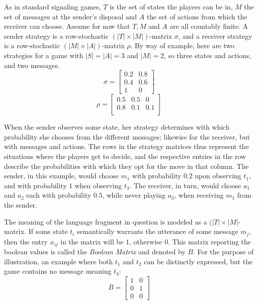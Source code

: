 \documentclass[10]{article}
\begin{document}
As in standard signaling games, $T$ is the set of states the players can be in, $M$ the set of messages at the sender's disposal and $A$ the set of actions from which the receiver can choose. Assume for now that $T,M$ and $A$ are all countably finite. A sender strategy is a row-stochastic $(|T| \times |M|)$-matrix $\sigma$, and a receiver strategy is a row-stochastic $(|M|\times |A|)$-matrix $\rho$. By way of example, here are two strategies for a game with $|S|=|A|=3$ and $|M|=2$, so three states and actions, and two messages. \\
\begin{equation*}
\sigma =
\begin{bmatrix}
0.2 & 0.8 \\
0.4 & 0.6 \\
1 & 0
\end{bmatrix}
\end{equation*}
\begin{equation*}
\rho =
\begin{bmatrix}
0.5 & 0.5 & 0\\
0.8 & 0.1 & 0.1 \\
\end{bmatrix}
\end{equation*}%

When the sender observes some state, her strategy determines with which probability she chooses from the different messages; likewise for the receiver, but with messages and actions. The rows in the strategy matrices thus represent the situations where the players get to decide, and the respective entries in the row describe the probabilities with which they opt for the move in that column. The sender, in this example, would choose $m_1$ with probability $0.2$ upon observing $t_1$, and with probability $1$ when observing $t_3$. The receiver, in turn, would choose $a_1$ and $a_2$ each with probability $0.5$, while never playing $a_3$, when receiving $m_1$ from the sender.

The meaning of the language fragment in question is modeled as a $(|T| \times |M|$-matrix. If some state $t_i$ semantically warrants the utterance of some message $m_j$, then the entry $x_{ij}$ in the matrix will be $1$, otherwise $0$. This matrix reporting the boolean values is called the \textit{Boolean Matrix} and denoted by $B$. For the purpose of illustration, an example where both $t_1$ and $t_2$ can be distinctly expressed, but the game contains no message meaning $t_3$:\\
\begin{equation*}
B =
\begin{bmatrix}
1 & 0\\
0 & 1\\
0 & 0
\end{bmatrix}
\end{equation*}
\end{document}

